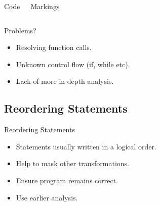\begin{frame}
\begin{columns}[t]
{\begin{block}{Code}
\end{block}
\begin{block}{Markings}
\begin{itemize}
\end{itemize}
\end{block}}
\end{columns}
\end{frame}

\begin{frame}{Problems?}
\begin{itemize}
\item Resolving function calls.
\item Unknown control flow (if, while etc).
\item Lack of more in depth analysis.
\end{itemize}
\end{frame}


\subsection{Reordering Statements}

\begin{frame}{Reordering Statements}
\begin{itemize}
\item Statements usually written in a logical order.
\item Help to mask other transformations.
\item Ensure program remains correct.
\item Use earlier analysis.
\end{itemize}
\end{frame}

